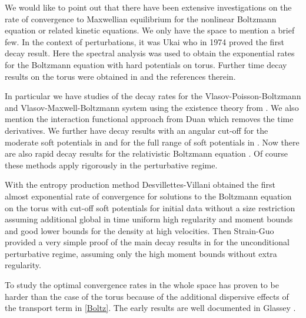 \documentclass{amsart}
\numberwithin{equation}{section}
\begin{document}
We would like to point out that there have been extensive investigations on the rate of convergence to Maxwellian equilibrium for the nonlinear Boltzmann equation or related kinetic equations.  We only have the space to mention a brief few.   In the context of perturbations,  it was Ukai \cite{MR0363332}
who in 1974 proved the first decay result.  Here the spectral analysis was used to obtain the exponential rates for the
Boltzmann equation with hard potentials on torus.  Further time decay results on the torus were obtained in \cite{MR2116276,arXiv:0912.1742,MR575897,MR2209761,MR2366140,strainSOFT} and the references therein.

In particular we have studies of the decay rates for the Vlasov-Poisson-Boltzmann \cite{arXiv:0912.1742} and Vlasov-Maxwell-Boltzmann \cite{MR2209761} system using the existence theory from \cite{MR2000470}.  
We also mention the interaction functional approach from Duan \cite{MR2420519} which removes the time derivatives.
We further have decay results with an angular cut-off for the moderate soft potentials in \cite{MR575897} and for the full range of soft potentials in \cite{MR2209761,MR2366140}.  Now there are also rapid decay results for the relativistic Boltzmann equation \cite{strainSOFT}.  Of course these methods apply rigorously in the perturbative regime.    

With the entropy production method Desvillettes-Villani \cite{MR2116276} obtained the first almost exponential
rate of convergence for solutions to the Boltzmann equation on the torus
with cut-off soft potentials for initial data without a size restriction assuming additional global in time uniform 
high regularity and moment bounds and  good lower bounds for the density at high velocities.  Then Strain-Guo \cite{MR2366140}
provided a very simple proof of the main decay results in \cite{MR2116276} for the unconditional perturbative regime, assuming only the high moment bounds without extra regularity. 

To study the optimal convergence rates in the whole space has proven to be harder than the case of the torus because of the additional dispersive effects of the transport term in \eqref{Boltz}.  
The early results are well documented in Glassey \cite{MR1379589}.  
\end{document}
